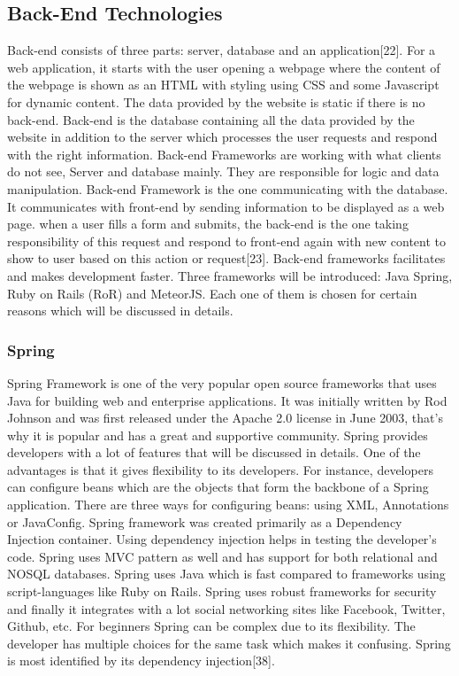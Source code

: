 \subsection{Back-End Technologies}
Back-end consists of three parts: server, database and an application[22]. For a web application, it starts with the user opening a webpage where the content of the webpage is shown as an HTML with styling using CSS and some Javascript for dynamic content. The data provided by the website is static if there is no back-end. Back-end is the database containing all the data provided by the website in addition to the server which processes the user requests and respond with the right information. Back-end Frameworks are working with what clients do not see, Server and database mainly. They are responsible for logic and data manipulation. Back-end Framework is the one communicating with the database. It communicates with front-end by sending information to be displayed as a web page. when a user fills a form and submits, the back-end is the one taking responsibility of this request and respond to front-end again with new content to show to user based on this action or request[23]. Back-end frameworks facilitates and makes development faster. Three frameworks will be introduced: Java Spring, Ruby on Rails (RoR) and MeteorJS. Each one of them is chosen for certain reasons which will be discussed in details.
\subsubsection{Spring}
Spring Framework is one of the very popular open source frameworks that uses Java for building web and enterprise applications. It was initially written by Rod Johnson and was first released under the Apache 2.0 license in June 2003, that’s why it is popular and has a great and supportive community. Spring provides developers with a lot of features that will be discussed in details. One of the advantages is that it gives flexibility to its developers. For instance, developers can configure beans which are the objects that form the backbone of a Spring application. There are three ways for configuring beans: using XML, Annotations or JavaConfig. Spring framework was created primarily as a Dependency Injection container. Using dependency injection helps in testing the developer’s code. Spring uses MVC pattern as well and has support for both relational and NOSQL databases. Spring uses Java which is fast compared to frameworks using script-languages like Ruby on Rails. Spring uses robust frameworks for security and finally it integrates with a lot social networking sites like Facebook, Twitter, Github, etc. For beginners Spring can be complex due to its flexibility. The developer has multiple choices for the same task which makes it confusing. Spring is most identified by its dependency injection[38].

